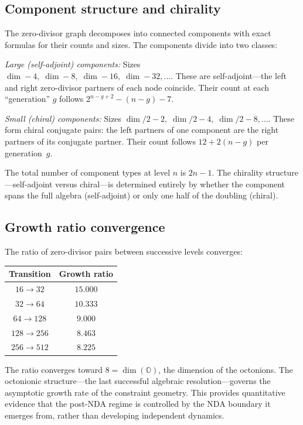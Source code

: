 \documentclass[12pt,a4paper]{article}
\theoremstyle{definition}
\theoremstyle{remark}
\newcommand{\OO}{\mathbb{O}}
\begin{document}
\subsection{Component structure and chirality}

The zero-divisor graph decomposes into connected components with
exact formulas for their counts and sizes. The components divide
into two classes:

\emph{Large (self-adjoint) components:} Sizes
$\dim - 4,\; \dim - 8,\; \dim - 16,\; \dim - 32, \ldots$.
These are self-adjoint---the left and right zero-divisor partners
of each node coincide. Their count at each ``generation'' $g$
follows $2^{n-g+2} - (n-g) - 7$.

\emph{Small (chiral) components:} Sizes
$\dim/2 - 2,\; \dim/2 - 4,\; \dim/2 - 8, \ldots$.
These form chiral conjugate pairs: the left partners of one
component are the right partners of its conjugate partner. Their
count follows $12 + 2(n - g)$ per generation~$g$.

The total number of component types at level $n$ is $2n - 1$.
The chirality structure---self-adjoint versus chiral---is
determined entirely by whether the component spans the full
algebra (self-adjoint) or only one half of the doubling
(chiral).

\subsection{Growth ratio convergence}

The ratio of zero-divisor pairs between successive levels
converges:

\begin{center}
\begin{tabular}{c|c}
\textbf{Transition} & \textbf{Growth ratio} \\
\hline
$16 \to 32$   & $15.000$ \\
$32 \to 64$   & $10.333$ \\
$64 \to 128$  & $9.000$ \\
$128 \to 256$ & $8.463$ \\
$256 \to 512$ & $8.225$ \\
\end{tabular}
\end{center}

The ratio converges toward $8 = \dim(\OO)$, the dimension of the
octonions. The octonionic structure---the last successful algebraic
resolution---governs the asymptotic growth rate of the constraint
geometry. This provides quantitative evidence that the post-NDA
regime is controlled by the NDA boundary it emerges from, rather
than developing independent dynamics.
\end{document}
